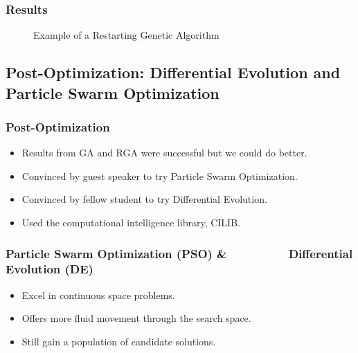 \documentclass[10pt]{beamer}
\begin{document}
\begin{frame}
	\frametitle{Results}

	\begin{figure}
		\caption{Example of a Restarting Genetic Algorithm}
	\end{figure}

\end{frame}

\subsection{Post-Optimization: Differential Evolution and Particle Swarm Optimization}

\begin{frame}
	\frametitle{Post-Optimization}

	\begin{itemize}
		\item Results from GA and RGA were successful but we could do better.
		\item Convinced by guest speaker to try Particle Swarm Optimization.
		\item Convinced by fellow student to try Differential Evolution.
		\item Used the computational intelligence library, CILIB.
	\end{itemize}
\end{frame}

\begin{frame}
	\frametitle{Particle Swarm Optimization (PSO) \& \,\,\,\,\,\,\,\,\,\,\,\,\,\,\,\,\,\,\,\,\,\,\,\,\,\,\,\, Differential Evolution (DE)}

	\begin{itemize}
		\item Excel in continuous space problems.
		\item Offers more fluid movement through the search space.
		\item Still gain a population of candidate solutions.
	\end{itemize}
\end{frame}
\end{document}
